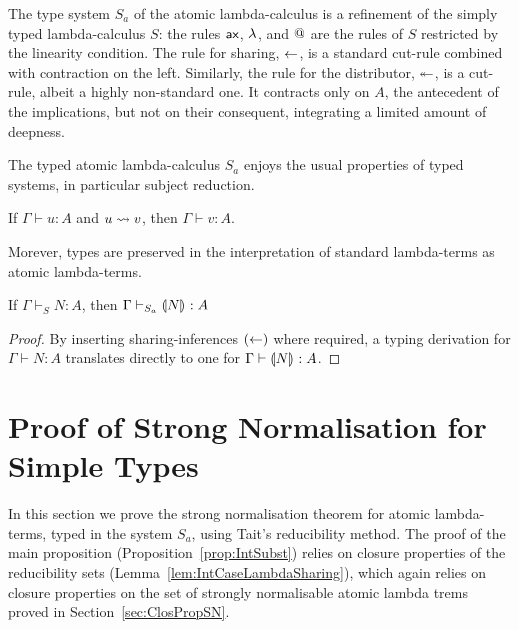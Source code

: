 \documentclass[orivec]{llncs}
\begin{document}
The type system $S_a$ of the atomic lambda-calculus is a refinement of the simply typed lambda-calculus $S$: the rules ${\mathsf{ax}}$, ${\lambda}$, and ${@}$ are the rules of $S$ restricted by the linearity condition.
%
The rule for sharing, ${\leftarrow}$, is a standard cut-rule combined with contraction on the left.
%
Similarly, the rule for the distributor, ${\twoheadleftarrow}$, is a cut-rule, albeit a highly non-standard one.
%
It contracts only on $A$, the antecedent of the implications, but not on their consequent, integrating a limited amount of deepness.


The typed atomic lambda-calculus ${S_a}$ enjoys the usual properties of typed systems, in particular subject reduction.


\begin{ALtheorem}
If $\Gamma\vdash u : A$ and $u \rewrite v$, then $\Gamma\vdash v : A$.
\end{ALtheorem}

\noindent
Morever, types are preserved in the interpretation of standard lambda-terms as atomic lambda-terms.

\begin{ALproposition}\label{prop:types preserved}
If $\Gamma\vdash_S N:A$, then $\Gamma\vdash_{S_a} {\llparenthesis{N}\rrparenthesis_{{}}}:A$
\end{ALproposition}

\begin{proof}
%
By inserting sharing-inferences $({\leftarrow})$ where required, a typing derivation for $\Gamma \vdash N : A$ translates directly to one for $\Gamma\vdash {\llparenthesis{N}\rrparenthesis_{{}}} : A$.
\end{proof}



\section{Proof of Strong Normalisation for Simple Types}
\label{sec:SNproof}

In this section we prove the strong normalisation theorem for atomic lambda-terms, typed in the system $S_a$,
using Tait's reducibility method. The proof of the main proposition (Proposition~\ref{prop:IntSubst}) relies on closure properties of the reducibility sets (Lemma~\ref{lem:IntCaseLambdaSharing}), which again relies on closure properties on the set of strongly normalisable atomic lambda trems proved in Section~\ref{sec:ClosPropSN}.
\end{document}
